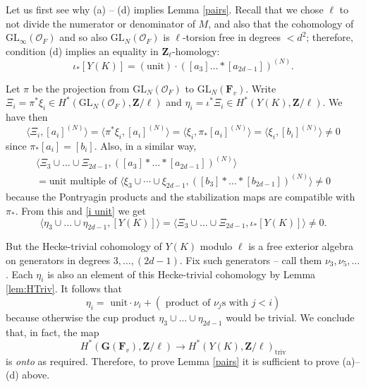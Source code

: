\documentclass[10pt]{amsart}
\newcommand{\Z}{\mathbf{Z}}
\newcommand{\triv}{\mathrm{triv}}
\newcommand{\OO}{\mathcal{O}}
\newcommand{\GL}{\mathrm{GL}}
\theoremstyle{remark}
\begin{document}
Let us first see why (a) -- (d) implies  Lemma \ref{pairs}.
 Recall that we chose $\ell$ to not divide the  
 numerator or denominator of $M$, and also that the cohomology of $\GL_{\infty}(\mathcal{O}_F)$ and so also
 $\GL_N(\mathcal{O}_F)$ is $\ell$-torsion free in degrees $< d^2$;
therefore,  condition (d) implies an equality in $\Z_{\ell}$-homology:
 \begin{equation} \label{i unit} \iota_*[Y(K)] =   \left( \mbox{unit} \right) \cdot  \left(  [a_3] \dots * [a_{2d-1}] \right)^{(N)}.\end{equation}
 

Let $\pi$ be the projection from $\GL_N(\mathcal{O}_F)$ to $\GL_N(\mathbf{F}_v)$. 
Write $\Xi_i = \pi^* \xi_i \in H^*(\GL_N(\OO_F), \Z/\ell)$ 
and $\eta_i = \iota^* \Xi_i \in H^*(Y(K), \Z/\ell)$. We have then
$$ \langle \Xi_i, [a_i]^{(N)} \rangle  = \langle \pi^* \xi_i, [a_i]^{(N)} \rangle =  \langle \xi_i, \pi_* [a_i]^{(N)} \rangle = \langle \xi_i, [b_i]^{(N)} \rangle \neq 0$$ 
since $\pi_* [a_i] = [b_i]$.  Also, in a similar way, 
\begin{multline}  \langle \Xi_3 \cup \dots \cup \Xi_{2d-1},  \left( [a_3]* \dots  * [a_{2d-1}]  \right)^{(N)} \rangle \\
= \mbox{unit multiple of }  \langle \xi_3 \cup \cdots \cup \xi_{2d-1},   \left( [b_3] * \dots *  [b_{2d-1}] \right)^{(N)}  \rangle \neq 0\end{multline}
because the Pontryagin products and the stabilization maps are compatible with $\pi_*$. 
From this and \eqref{i unit} we get
 $$ \langle \eta_3 \cup \dots \cup \eta_{2d-1} , [Y(K)] \rangle = \langle \Xi_3 \cup \dots \cup \Xi_{2d-1}, \iota_* [Y(K)] \rangle \neq 0.$$ 

 
 But the Hecke-trivial cohomology of $Y(K)$ modulo $\ell$ is a free exterior algebra on generators in degrees $ 3, \dots, (2d-1)$. 
 Fix such generators -- call them $\nu_3, \nu_5, \dots$. 
Each $\eta_i$ is  also an element of this Hecke-trivial cohomology by Lemma \ref{lem:HTriv}. It follows that
 $$\eta_i = \mbox{ unit} \cdot \nu_i + \left(  \mbox{ product of $\nu_j$s with $j < i$}\right)$$
 because otherwise the cup product
 $\eta_3 \cup \dots \cup \eta_{2d-1}$ would be trivial.
 We conclude that, in fact, the 
 map
\begin{equation} \label{sarge000} H^*(\mathbf{G}(\mathbf{F}_v), \Z/\ell) \rightarrow H^*(Y(K), \Z/\ell)_{\triv} \end{equation}
 is {\em onto} as required.
 Therefore, to prove Lemma \ref{pairs} it is sufficient to prove (a)--(d) above. 
 
\end{document}
